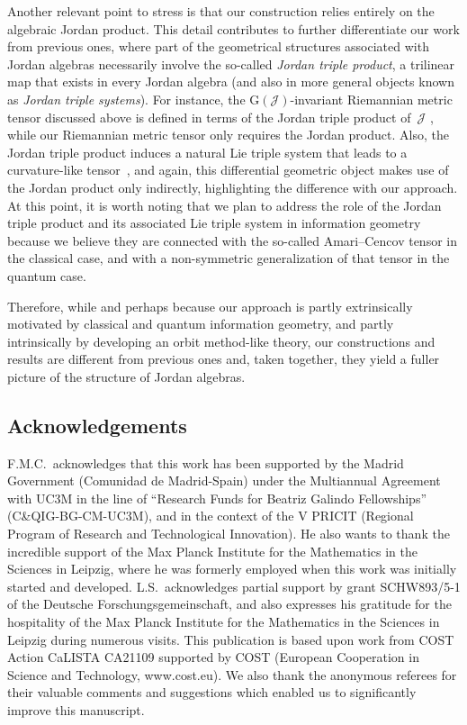 \documentclass[10pt,a4paper]{amsart}
\numberwithin{equation}{section}
\newcommand{\Jcal}{\mathcal{J}}
\newcommand{\G}{\mathrm{G}}
\begin{document}
Another relevant point to stress is that our construction relies entirely on the algebraic Jordan product.
This detail contributes to further differentiate our work from previous ones, where part of the geometrical structures associated with Jordan algebras necessarily involve the so-called \emph{Jordan triple product}, a trilinear map that exists in every Jordan algebra (and also in more general objects known as \emph{Jordan triple systems}).
For instance, the $\G(\Jcal)$-invariant Riemannian metric tensor discussed above is defined in terms of the Jordan triple product of~$\Jcal$ \cite[Theorem~2.3.19]{Chu-2012}, while our Riemannian metric tensor only requires the Jordan product.
Also, the Jordan triple product induces a natural Lie triple system that leads to a curvature-like tensor~\cite{Bertram-2000}, and again, this differential geometric object makes use of the Jordan product only indirectly, highlighting the difference with our approach.
At this point, it is worth noting that we plan to address the role of the Jordan triple product and its associated Lie triple system in information geometry because we believe they are connected with the so-called Amari--Cencov tensor in the classical case, and with a non-symmetric generalization of that tensor in the quantum case.

Therefore, while and perhaps because our approach is partly extrinsically motivated by classical and quantum information geometry, and partly intrinsically by developing an orbit method-like theory, our constructions and results are different from previous ones and, taken together, they yield a fuller picture of the structure of Jordan algebras.

\subsection*{Acknowledgements}

F.M.C.\ acknowledges that this work has been supported by the Madrid Government (Comunidad de Madrid-Spain) under the Multiannual Agreement with UC3M in the line of ``Research Funds for Beatriz Galindo Fellowships'' (C\&QIG-BG-CM-UC3M), and in the context of the V PRICIT (Regional Program of Research and Technological Innovation).
He also wants to thank the incredible support of the Max Planck Institute for the Mathematics in the Sciences in Leipzig, where he was formerly employed when this work was initially started and developed.
L.S.~acknowledges partial support by grant SCHW893/5-1 of the
Deutsche Forschungsgemeinschaft, and also expresses his gratitude for the hospitality of the Max Planck Institute for the Mathematics in the Sciences in Leipzig during numerous visits.
This publication is based upon work from COST Action CaLISTA CA21109 supported by COST (European Cooperation in Science and Technology, www.cost.eu).
We also thank the anonymous referees for their valuable comments and suggestions which enabled us to significantly improve this manuscript.
\end{document}
